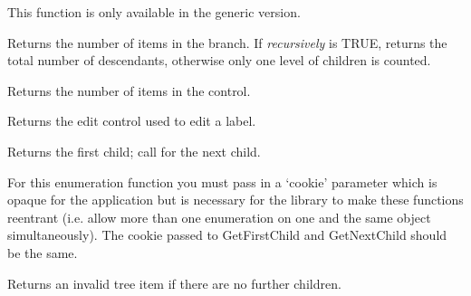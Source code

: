 This function is only available in the generic version.

\label{wxtreectrlgetchildrencount}


Returns the number of items in the branch. If {\it recursively} is TRUE, returns the total number
of descendants, otherwise only one level of children is counted.

\label{wxtreectrlgetcount}


Returns the number of items in the control.

\label{wxtreectrlgeteditcontrol}


Returns the edit control used to edit a label.

\label{wxtreectrlgetfirstchild}


Returns the first child; call  for the next child.

For this enumeration function you must pass in a `cookie' parameter
which is opaque for the application but is necessary for the library
to make these functions reentrant (i.e. allow more than one
enumeration on one and the same object simultaneously). The cookie passed to
GetFirstChild and GetNextChild should be the same.

Returns an invalid tree item if there are no further children.





\label{wxtreectrlgetfirstvisibleitem}

